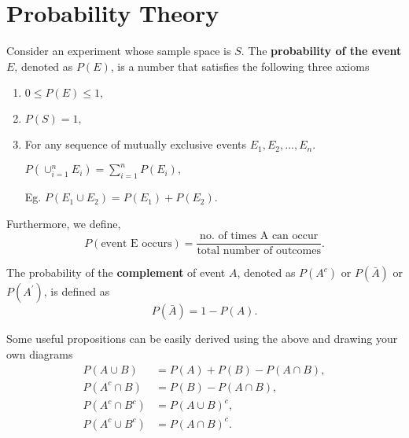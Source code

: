 \section{Probability Theory}\label{mod2:section:ProbabilityTheory}


\begin{axiom}  \label{mod2:axiom:ProbabilityAxioms}
	Consider an experiment whose sample space is $S$. The \textbf{probability of the event $E$}, denoted as $P(E)$, is a number that satisfies the following three axioms	
	\begin{enumerate}[label = \bfseries (\arabic*)]
		\item 	$0 \leq P(E) \leq 1 , $ \label{mod2:axiom:ProbabilityAxiom:1}
				
			
		
		\item 	$	P(S) = 1, $ \label{mod2:axiom:ProbabilityAxiom:2}
				
			
		
		\item 	For any sequence of mutually exclusive events $E_1, E_2, ... , E_n$.
		
			
					$P\left( \cup_{i=1}^n E_i \right) = \sum_{i=1}^n P(E_i), $ \label{mod2:axiom:ProbabilityAxiom:3}
			
			
			
				Eg. $P(E_1 \cup E_2) = P(E_1)+P(E_2)$.
		
		
	\end{enumerate}
\end{axiom}


\begin{defn} \label{mod2:defn:Probability}
	Furthermore, we define,
	\begin{equation}
		P(\text{event E occurs}) = \frac{\text{no. of times A can occur}}{\text{total number of outcomes}}. 
	\end{equation}
\end{defn}



\begin{defn} \label{mod2:defn:Complement}
	The probability of the \textbf{complement} of event $A$, denoted as $P(A^c)$ or $P(\bar{A})$ or $P(A^\prime)$, is defined as
	\begin{equation}
		P(\bar{A}) = 1 - P(A).
	\end{equation}
\end{defn}


\begin{prop} \label{mod2:prop:SetPropositions}
Some useful propositions can be easily derived using the above and drawing your own diagrams
\begin{align}
P(A \cup B) &= P(A) + P(B) - P(A \cap B), \label{mod2:eq:SetProp:1}  \\ 
P(A^c \cap B) &= P(B) - P(A \cap B), \label{mod2:eq:SetProp:2} \\ 
P(A^c \cap B^c) &=  P(A \cup B)^c ,\label{mod2:eq:SetProp:3} \\ 
P(A^c \cup B^c) &= P (A \cap B) ^c .\label{mod2:eq:SetProp:4} \ 
\end{align}
\end{prop}


